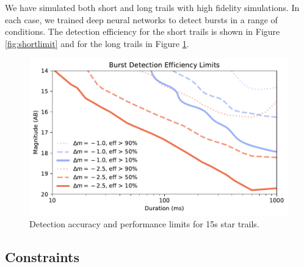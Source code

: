 \documentclass[12pt, letterpaper]{article}
\begin{document}
We have simulated both short and long trails with high fidelity simulations. In each case, we trained deep neural networks to detect bursts in a range of conditions. The detection efficiency for the short trails is shown in Figure \ref{fig:shortlimit} and for the long trails in Figure \ref{fig:longlimit}. 

\begin{figure}[htb!]
\center
\includegraphics{f7.pdf}
\caption{Detection accuracy and performance limits for 15s star trails.}
\label{fig:longlimit}
\end{figure}


\subsection{Constraints}
\end{document}
